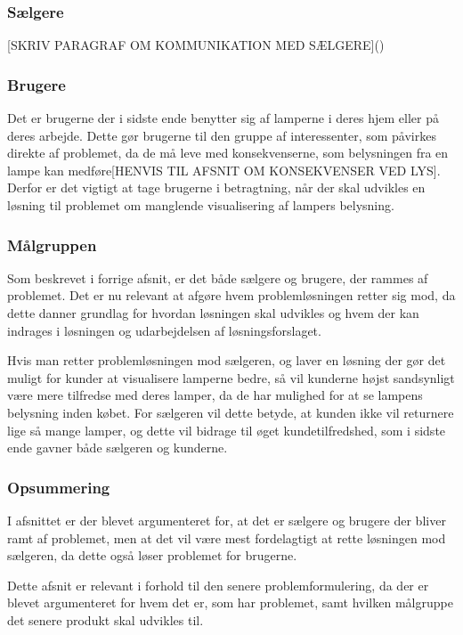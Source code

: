 \subsubsection{Sælgere}
[SKRIV PARAGRAF OM KOMMUNIKATION MED SÆLGERE]()
\subsubsection{Brugere}
Det er brugerne der i sidste ende benytter sig af lamperne i deres hjem eller på deres arbejde. Dette gør brugerne til den gruppe af interessenter, som påvirkes direkte af problemet, da de må leve med konsekvenserne, som belysningen fra en lampe kan medføre[HENVIS TIL AFSNIT OM KONSEKVENSER VED LYS]. Derfor er det vigtigt at tage brugerne i betragtning, når der skal udvikles en løsning til problemet om manglende visualisering af lampers belysning. 

\subsubsection{Målgruppen}
Som beskrevet i forrige afsnit, er det både sælgere og brugere, der rammes af problemet. Det er nu relevant at afgøre hvem problemløsningen retter sig mod, da dette danner grundlag for hvordan løsningen skal udvikles og hvem der kan indrages i løsningen og udarbejdelsen af løsningsforslaget. 


Hvis man retter problemløsningen mod sælgeren, og laver en løsning der gør det muligt for kunder at visualisere lamperne bedre, så vil kunderne højst sandsynligt være mere tilfredse med deres lamper, da de har mulighed for at se lampens belysning inden købet. For sælgeren vil dette betyde, at kunden ikke vil returnere lige så mange lamper, og dette vil bidrage til øget kundetilfredshed, som i sidste ende gavner både sælgeren og kunderne.

\subsubsection*{Opsummering}
I afsnittet er der blevet argumenteret for, at det er sælgere og brugere der bliver ramt af problemet, men at det vil være mest fordelagtigt at rette løsningen mod sælgeren, da dette også løser problemet for brugerne.

Dette afsnit er relevant i forhold til den senere problemformulering, da der er blevet argumenteret for hvem det er, som har problemet, samt hvilken målgruppe det senere produkt skal udvikles til.
